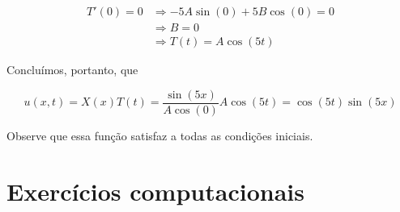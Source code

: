 \documentclass{article}
\begin{document}
\begin{enumerate}
                \begin{align*}
                    T'(0) = 0 &\Rightarrow -5A \sin(0) + 5B\cos(0) = 0 \\
                    &\Rightarrow B = 0 \\
                    &\Rightarrow T(t) = A \cos(5t)
                \end{align*}

                Concluímos, portanto, que

                $$u(x, t) = X(x)T(t) = \dfrac{\sin(5x)}{A \cos(0)}A \cos(5t) = \cos(5t)\sin(5x)$$

                Observe que essa função satisfaz a todas as condições iniciais.
        \end{enumerate}

    \section*{Exercícios computacionais}
\end{document}
